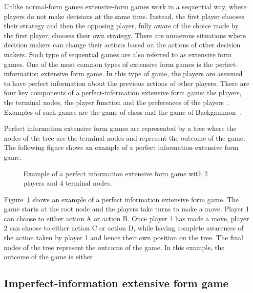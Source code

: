 Unlike normal-form games extensive-form games work in a sequential way, where
players do not make decisions at the same time.
Instead, the first player chooses their strategy and then the opposing player,
fully aware of the choice made by the first player, chooses their own strategy.
There are numerous situations where decision makers can change their actions
based on the actions of other decision makers.
Such type of sequential games are also referred to as extensive form games.
One of the most common types of extensive form games is the perfect-information
extensive form game.
In this type of game, the players are assumed to have perfect information
about the previous actions of other
players.
There are four key components of a perfect-information extensive form game; the
players, the terminal nodes, the player function and the preferences of the
players~\cite{osborne2004_extensive_form_games}.
Examples of such games are the game of chess and the game of
Backgammon~\cite{hart1992games}.

Perfect information extensive form games are represented by a tree where the
nodes of the tree are the terminal nodes and represent the outcome of the
game.
The following figure shows an example of a perfect information extensive form
game.

\begin{figure}[H]
    \centering
    
    \caption{Example of a perfect information extensive form game with \(2\)
    players and \(4\) terminal nodes.}
    \label{fig:extensive_form_game}
\end{figure}

Figure~\ref{fig:extensive_form_game} shows an example of a perfect information
extensive form game.
The game starts at the root node and the players take turns to make a move.
Player 1 can choose to either action A or action B.
Once player 1 has made a move, player 2 can choose to either action C or action
D, while having complete awareness of the action taken by player 1 and hence
their own position on the tree.
The final nodes of the tree represent the outcome of the game.
In this example, the outcome of the game is either 

\subsection{Imperfect-information extensive form game}
\label{sec:game_imperfect_information}

